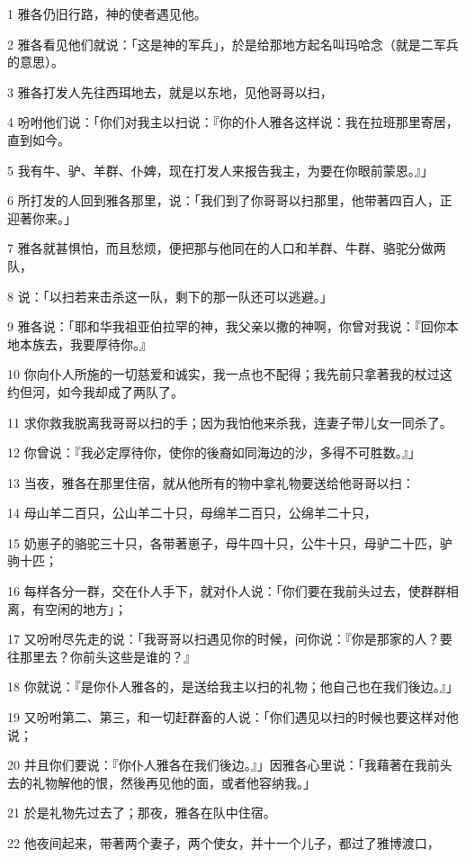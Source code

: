 \par 1 雅各仍旧行路，神的使者遇见他。
\par 2 雅各看见他们就说：「这是神的军兵」，於是给那地方起名叫玛哈念（就是二军兵的意思）。
\par 3 雅各打发人先往西珥地去，就是以东地，见他哥哥以扫，
\par 4 吩咐他们说：「你们对我主以扫说：『你的仆人雅各这样说：我在拉班那里寄居，直到如今。
\par 5 我有牛、驴、羊群、仆婢，现在打发人来报告我主，为要在你眼前蒙恩。』」
\par 6 所打发的人回到雅各那里，说：「我们到了你哥哥以扫那里，他带著四百人，正迎著你来。」
\par 7 雅各就甚惧怕，而且愁烦，便把那与他同在的人口和羊群、牛群、骆驼分做两队，
\par 8 说：「以扫若来击杀这一队，剩下的那一队还可以逃避。」
\par 9 雅各说：「耶和华我祖亚伯拉罕的神，我父亲以撒的神啊，你曾对我说：『回你本地本族去，我要厚待你。』
\par 10 你向仆人所施的一切慈爱和诚实，我一点也不配得；我先前只拿著我的杖过这约但河，如今我却成了两队了。
\par 11 求你救我脱离我哥哥以扫的手；因为我怕他来杀我，连妻子带儿女一同杀了。
\par 12 你曾说：『我必定厚待你，使你的後裔如同海边的沙，多得不可胜数。』」
\par 13 当夜，雅各在那里住宿，就从他所有的物中拿礼物要送给他哥哥以扫：
\par 14 母山羊二百只，公山羊二十只，母绵羊二百只，公绵羊二十只，
\par 15 奶崽子的骆驼三十只，各带著崽子，母牛四十只，公牛十只，母驴二十匹，驴驹十匹；
\par 16 每样各分一群，交在仆人手下，就对仆人说：「你们要在我前头过去，使群群相离，有空闲的地方」；
\par 17 又吩咐尽先走的说：「我哥哥以扫遇见你的时候，问你说：『你是那家的人？要往那里去？你前头这些是谁的？』
\par 18 你就说：『是你仆人雅各的，是送给我主以扫的礼物；他自己也在我们後边。』」
\par 19 又吩咐第二、第三，和一切赶群畜的人说：「你们遇见以扫的时候也要这样对他说；
\par 20 并且你们要说：『你仆人雅各在我们後边。』」因雅各心里说：「我藉著在我前头去的礼物解他的恨，然後再见他的面，或者他容纳我。」
\par 21 於是礼物先过去了；那夜，雅各在队中住宿。
\par 22 他夜间起来，带著两个妻子，两个使女，并十一个儿子，都过了雅博渡口，
